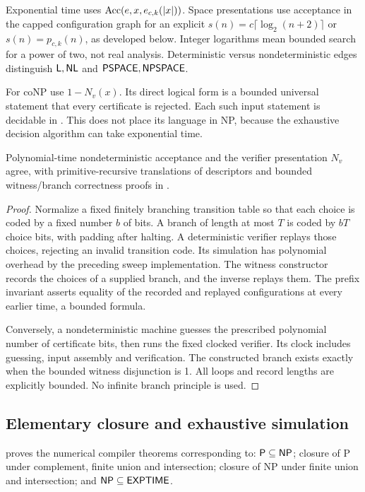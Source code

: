 Exponential time uses \(\operatorname{Acc}(e,x,e_{c,k}(\lvert x\rvert))\). Space presentations
use acceptance in the capped configuration graph for an explicit
\(s(n)=c\lceil\log_2(n+2)\rceil\) or \(s(n)=p_{c,k}(n)\), as developed
below. Integer logarithms mean bounded search for a power of two, not real
analysis. Deterministic versus nondeterministic edges distinguish
\(\mathsf L,\mathsf{NL}\) and \(\mathsf{PSPACE},\mathsf{NPSPACE}\).

For coNP use \(1-N_v(x)\). Its direct logical form is a bounded universal
statement that every certificate is rejected. Each such input statement is
decidable in \ipra. This does not place its language in NP, because the
exhaustive decision algorithm can take exponential time.

\begin{theorem}
Polynomial-time nondeterministic acceptance and the verifier presentation
\(N_v\) agree, with primitive-recursive translations of descriptors and
bounded witness/branch correctness proofs in \ipra.
\end{theorem}

\begin{proof}
Normalize a fixed finitely branching transition table so that each choice
is coded by a fixed number \(b\) of bits. A branch of length at most \(T\)
is coded by \(bT\) choice bits, with padding after halting. A deterministic
verifier replays those choices, rejecting an invalid transition code. Its
simulation has polynomial overhead by the preceding sweep implementation.
The witness constructor records the choices of a supplied branch, and the
inverse replays them. The prefix invariant asserts equality of the recorded
and replayed configurations at every earlier time, a bounded formula.

Conversely, a nondeterministic machine guesses the prescribed polynomial
number of certificate bits, then runs the fixed clocked verifier. Its clock
includes guessing, input assembly and verification. The constructed branch
exists exactly when the bounded witness disjunction is 1. All loops and
record lengths are explicitly bounded. No infinite branch principle is used.
\end{proof}

\subsection{Elementary closure and exhaustive simulation}

\begin{theorem}
\label{thm:closure}
\ipra{} proves the numerical compiler theorems corresponding to:
\(\mathsf P\subseteq\mathsf{NP}\); closure of P under complement, finite union and
intersection; closure of NP under finite union and intersection; and
\(\mathsf{NP}\subseteq\mathsf{EXPTIME}\).
\end{theorem}


